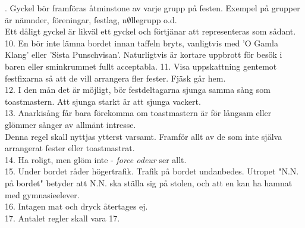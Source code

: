 \documentclass[a6paper,10pt]{article}
\begin{document}
. Gyckel bör framföras åtminstone av varje grupp på festen. Exempel på grupper är nämnder, föreningar, festlag, n$\emptyset$llegrupp o.d. \\Ett dåligt gyckel är likväl ett gyckel och förtjänar att representeras som sådant.
\vspace{5pt} \\
10. En bör inte lämna bordet innan taffeln bryts, vanligtvis med 'O Gamla Klang' eller 'Sista Punschvisan'. Naturligtvis är kortare uppbrott för besök i baren eller sminkrummet fullt acceptabla.\vspace{5pt}   
11. Visa uppskattning gentemot festfixarna så att de vill arrangera fler fester. Fjäsk går hem.
\vspace{5pt} \\
12. I den mån det är möjligt, bör festdeltagarna sjunga samma sång som toastmastern. Att sjunga starkt är att sjunga vackert.
\vspace{5pt} \\
13. Anarkisång får bara förekomma om toastmastern är för långsam eller glömmer sånger av allmänt intresse.\\ Denna regel skall nyttjas ytterst varsamt. Framför allt av de som inte själva arrangerat fester eller toastmastrat.
\vspace{5pt} \\
14. Ha roligt, men glöm inte - \textit{force odeur} ser allt.
\vspace{-11pt}
\vspace{5pt}   \\
15. Under bordet råder högertrafik. Trafik på bordet undanbedes. Utropet "N.N. på bordet" betyder att N.N. ska ställa sig på stolen, och att en kan ha hamnat med gymnasieelever.
\vspace{5pt} \\
16. Intagen mat och dryck återtages ej.
\vspace{5pt} \\
17. Antalet regler skall vara 17.
\end{document}
